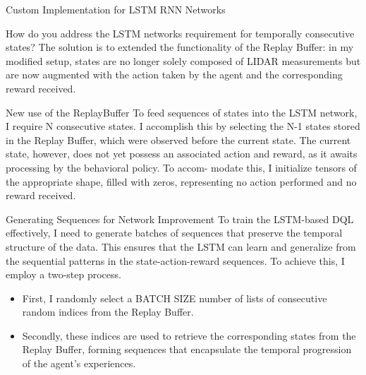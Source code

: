 \documentclass[presentation]{beamer}\mode<presentation>{\usetheme{AMSBolognaFC}}
\begin{document}
\begin{frame}[allowframebreaks]{Custom Implementation for LSTM RNN Networks}
	\begin{block}{How do you address the LSTM networks requirement for temporally consecutive states?}
		The solution is to extended the functionality of the Replay Buffer: in my modified setup, 
		states are no longer solely composed of LIDAR measurements but 
		are now augmented with the action taken by the agent and the corresponding 
		reward received.
	\end{block}
	\begin{block}{New use of the ReplayBuffer}
		To feed sequences of states into the LSTM network, I require N consecutive states. I accomplish this by selecting the N-1 states stored in the Replay Buffer, which were observed before the current state. The current state, however, does not yet possess an associated action and reward, as it awaits processing by the behavioral policy. To accom- modate this, I initialize tensors of the appropriate shape, filled with zeros, representing no action performed and no reward received.
	\end{block}
	\begin{block}{Generating Sequences for Network Improvement}
		To train the LSTM-based DQL effectively, I need to generate batches of sequences that preserve the temporal structure of the data. This ensures that the LSTM can learn and generalize from the sequential patterns in the state-action-reward sequences.
		To achieve this, I employ a two-step process.
		\begin{itemize}
			\item First, I randomly select a BATCH SIZE number of lists of consecutive random indices from the Replay Buffer. 
			\item Secondly, these indices are used to retrieve the corresponding states from the Replay Buffer, forming sequences that encapsulate the temporal progression of the agent’s experiences.
		\end{itemize}
	\end{block}
\end{frame}
\end{document}
